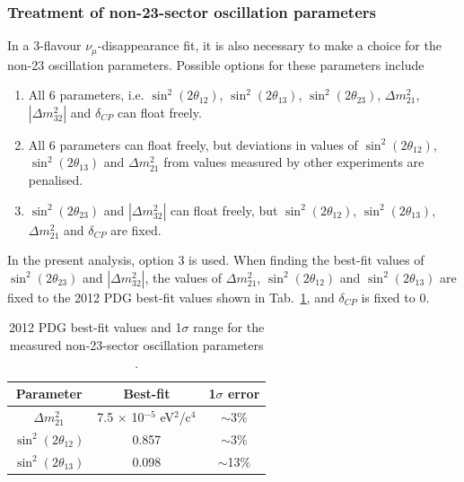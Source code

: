 \subsubsection {Treatment of non-23-sector oscillation parameters}
\label{sec:oscfit_method_non23params}

In a 3-flavour $\nu_{\mu}$-disappearance fit, it is also necessary to make a choice for the non-23 oscillation parameters. 
Possible options for these parameters include
\begin{enumerate}
\item All 6 parameters, i.e. $\sin^{2}(2 \theta_{12})$, $\sin^{2}(2 \theta_{13})$, $\sin^{2}(2 \theta_{23})$, $\Delta m_{21}^{2}$,
$|\Delta m_{32}^{2}|$ and $\delta_{CP}$ can float freely.
\item All 6 parameters can float freely, but deviations in values of $\sin^{2}(2 \theta_{12})$, $\sin^{2}(2 \theta_{13})$ and
$\Delta m_{21}^{2}$ from values measured by other experiments are penalised.
\item $\sin^{2}(2 \theta_{23})$ and $|\Delta m_{32}^{2}|$ can float freely, but $\sin^{2}(2 \theta_{12})$, $\sin^{2}(2 \theta_{13})$,
$\Delta m_{21}^{2}$ and $\delta_{CP}$ are fixed.
\end{enumerate}

In the present analysis, option 3 is used. 
When finding the best-fit values of $\sin^{2}(2 \theta_{23})$ and $|\Delta m_{32}^{2}|$,
the values of $\Delta m_{21}^{2}$, $\sin^{2}(2 \theta_{12})$ and $\sin^{2}(2 \theta_{13})$
are fixed to the 2012 PDG best-fit values \cite{PDG2012} shown in Tab.\ \ref{tab:pdg2012non23},
and $\delta_{CP}$ is fixed to 0.

\begin{table}
\centering
\begin{tabular}{| c | c | c | }
\hline
Parameter                  &  Best-fit                                    & 1$\sigma$ error  \\
\hline
$\Delta m_{21}^{2}$        &  7.5 $\times$ 10$^{-5}$ eV$^{2}$/c$^{4}$     & $\sim$3\% \\
$\sin^{2}(2 \theta_{12})$  &  0.857                                       & $\sim$3\% \\
$\sin^{2}(2 \theta_{13})$  &  0.098                                       & $\sim$13\% \\
\hline
\end{tabular}
\caption{
  2012 PDG best-fit values and 1$\sigma$ range for the measured non-23-sector oscillation parameters \cite{PDG2012}.
}
\label{tab:pdg2012non23}
\end{table}


